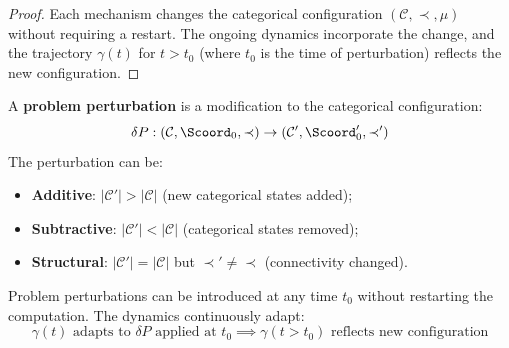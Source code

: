 \begin{proof}
Each mechanism changes the categorical configuration $(\mathcal{C}, \prec, \mu)$ without requiring a restart. The ongoing dynamics incorporate the change, and the trajectory $\gamma(t)$ for $t > t_0$ (where $t_0$ is the time of perturbation) reflects the new configuration.
\end{proof}

\begin{definition}
\label{def:problem_perturbation}
A \textbf{problem perturbation} is a modification to the categorical configuration:
\begin{equation}
\delta P: (\mathcal{C}, \Scoord_0, \prec) \to (\mathcal{C}', \Scoord_0', \prec')
\end{equation}
The perturbation can be:
\begin{itemize}
    \item \textbf{Additive}: $|\mathcal{C}'| > |\mathcal{C}|$ (new categorical states added);
    \item \textbf{Subtractive}: $|\mathcal{C}'| < |\mathcal{C}|$ (categorical states removed);
    \item \textbf{Structural}: $|\mathcal{C}'| = |\mathcal{C}|$ but $\prec' \neq \prec$ (connectivity changed).
\end{itemize}
\end{definition}

\begin{theorem}
\label{thm:continuous_refinement}
Problem perturbations can be introduced at any time $t_0$ without restarting the computation. The dynamics continuously adapt:
\begin{equation}
\gamma(t) \text{ adapts to } \delta P \text{ applied at } t_0 \implies \gamma(t > t_0) \text{ reflects new configuration}
\end{equation}
\end{theorem}

